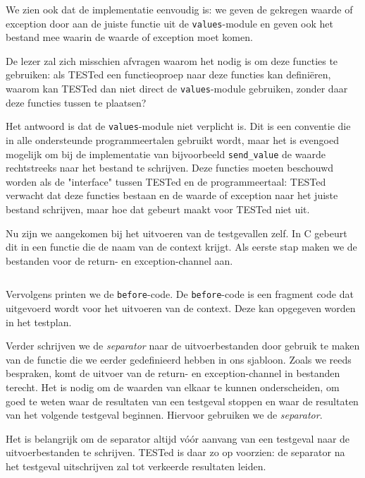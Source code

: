 \inputminted[firstline=25,lastline=27]{mako}{sources/c-context.mako}
\vspace{-1.7cm} %
\inputminted[firstline=29,lastline=30]{mako}{sources/c-context.mako}

We zien ook dat de implementatie eenvoudig is: we geven de gekregen waarde of exception door aan de juiste functie uit de \texttt{values}-module en geven ook het bestand mee waarin de waarde of exception moet komen.

De lezer zal zich misschien afvragen waarom het nodig is om deze functies te gebruiken: als TESTed een functieoproep naar deze functies kan definiëren, waarom kan TESTed dan niet direct de \texttt{values}-module gebruiken, zonder daar deze functies tussen te plaatsen?

Het antwoord is dat de \texttt{values}-module niet verplicht is.
Dit is een conventie die in alle ondersteunde programmeertalen gebruikt wordt, maar het is evengoed mogelijk om bij de implementatie van bijvoorbeeld \texttt{send\_value} de waarde rechtstreeks naar het bestand te schrijven.
Deze functies moeten beschouwd worden als de "interface" tussen TESTed en de programmeertaal: TESTed verwacht dat deze functies bestaan en de waarde of exception naar het juiste bestand schrijven, maar hoe dat gebeurt maakt voor TESTed niet uit.

Nu zijn we aangekomen bij het uitvoeren van de testgevallen zelf.
In C gebeurt dit in een functie die de naam van de context krijgt.
Als eerste stap maken we de bestanden voor de return- en exception-channel aan.

\inputminted[firstline=33,lastline=36]{mako}{sources/c-context.mako}

Vervolgens printen we de \texttt{before}-code.
De \texttt{before}-code is een fragment code dat uitgevoerd wordt voor het uitvoeren van de context.
Deze kan opgegeven worden in het testplan.

Verder schrijven we de \emph{separator} naar de uitvoerbestanden door gebruik te maken van de functie die we eerder gedefinieerd hebben in ons sjabloon.
Zoals we reeds bespraken, komt de uitvoer van de return- en exception-channel in bestanden terecht.
Het is nodig om de waarden van elkaar te kunnen onderscheiden, om goed te weten waar de resultaten van een testgeval stoppen en waar de resultaten van het volgende testgeval beginnen.
Hiervoor gebruiken we de \emph{separator}.

Het is belangrijk om de separator altijd vóór aanvang van een testgeval naar de uitvoerbestanden te schrijven.
TESTed is daar zo op voorzien: de separator na het testgeval uitschrijven zal tot verkeerde resultaten leiden.

